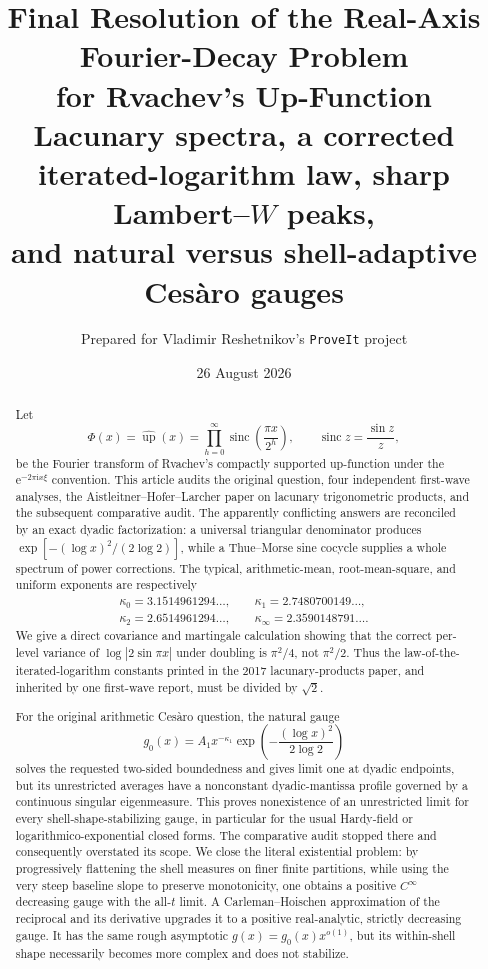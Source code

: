 \documentclass[11pt]{article}
\title{\bfseries Final Resolution of the Real-Axis Fourier-Decay Problem\\
for Rvachev's Up-Function\\[0.4em]
\large Lacunary spectra, a corrected iterated-logarithm law, sharp Lambert--\(W\) peaks,\\
and natural versus shell-adaptive Ces\`aro gauges}
\author{Prepared for Vladimir Reshetnikov's \texttt{ProveIt} project}
\date{26 August 2026}
\theoremstyle{definition}
\theoremstyle{remark}
\newcommand{\e}{\mathrm e}
\newcommand{\ii}{\mathrm i}
\newcommand{\Up}{\operatorname{up}}
\newcommand{\sinc}{\operatorname{sinc}}
\begin{document}
\maketitle

\begin{abstract}
Let
\[
 \Phi(x)=\widehat{\Up}(x)
 =\prod_{h=0}^{\infty}\sinc\!\left(\frac{\pi x}{2^h}\right),
 \qquad \sinc z=\frac{\sin z}{z},
\]
be the Fourier transform of Rvachev's compactly supported up-function under the
\(\e^{-2\pi\ii x\xi}\) convention.  This article audits the original question,
four independent first-wave analyses, the Aistleitner--Hofer--Larcher paper on
lacunary trigonometric products, and the subsequent comparative audit.  The
apparently conflicting answers are reconciled by an exact dyadic factorization:
a universal triangular denominator produces
\(\exp[-(\log x)^2/(2\log2)]\), while a Thue--Morse sine cocycle supplies a
whole spectrum of power corrections.  The typical, arithmetic-mean,
root-mean-square, and uniform exponents are respectively
\[
 \begin{gathered}
 \kappa_0=3.1514961294\ldots,\qquad
 \kappa_1=2.7480700149\ldots,\\
 \kappa_2=2.6514961294\ldots,\qquad
 \kappa_\infty=2.3590148791\ldots.
 \end{gathered}
\]
We give a direct covariance and martingale calculation showing that the correct
per-level variance of \(\log|2\sin\pi x|\) under doubling is \(\pi^2/4\), not
\(\pi^2/2\).  Thus the law-of-the-iterated-logarithm constants printed in the
2017 lacunary-products paper, and inherited by one first-wave report, must be
divided by \(\sqrt2\).

For the original arithmetic Ces\`aro question, the natural gauge
\[
 g_0(x)=A_1x^{-\kappa_1}
 \exp\!\left(-\frac{(\log x)^2}{2\log2}\right)
\]
solves the requested two-sided boundedness and gives limit one at dyadic
endpoints, but its unrestricted averages have a nonconstant dyadic-mantissa
profile governed by a continuous singular eigenmeasure.  This proves
nonexistence of an unrestricted limit for every shell-shape-stabilizing gauge,
in particular for the usual Hardy-field or logarithmico-exponential closed
forms.  The comparative audit stopped there and consequently overstated its
scope.  We close the literal existential problem: by progressively flattening
the shell measures on finer finite partitions, while using the very steep
baseline slope to preserve monotonicity, one obtains a positive \(C^\infty\)
decreasing gauge with the all-\(t\) limit.  A Carleman--Hoischen approximation
of the reciprocal and its derivative upgrades it to a positive real-analytic,
strictly decreasing gauge.  It has the same rough asymptotic
\(g(x)=g_0(x)x^{o(1)}\), but its within-shell shape necessarily becomes more
complex and does not stabilize.


\end{abstract}
\end{document}
